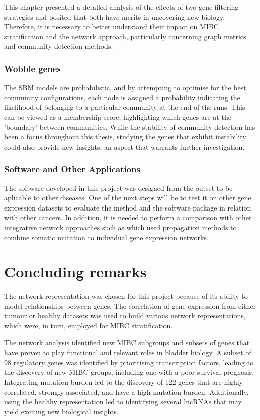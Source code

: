 This chapter presented a detailed analysis of the effects of two gene filtering strategies and posited that both have merits in uncovering new biology. Therefore, it is necessary to better understand their impact on MIBC stratification and the network approach, particularly concerning graph metrics and community detection methods. 

\subsubsection*{Wobble genes}

The SBM models are probabilistic, and by attempting to optimise for the best community configurations, each node is assigned a probability indicating the likelihood of belonging to a particular community at the end of the runs. This can be viewed as a membership score, highlighting which genes are at the 'boundary' between communities. While the stability of community detection has been a focus throughout this thesis, studying the genes that exhibit instability could also provide new insights, an aspect that warrants further investigation.

\subsubsection*{Software and Other Applications}

The software developed in this project was designed from the outset to be aplicable to other diseases. One of the next steps will be to test it on other gene expression datasets to evaluate the method and the software package in relation with other cancers. In addition, it is needed to perform a comparison with other integrative network approaches such as \citet{Hofree2013-ld,He2017-dj} which used propagation methods to combine somatic mutation to individual gene expression networks.


\section{Concluding remarks}

The network representation was chosen for this project because of its ability to model relationships between genes. The correlation of gene expression from either tumour or healthy datasets was used to build various network representations, which were, in turn, employed for MIBC stratification.


The network analysis identified new MIBC subgroups and subsets of genes that have proven to play functional and relevant roles in bladder biology. A subset of 98 regulatory genes was identified by prioritising transcription factors, leading to the discovery of new MIBC groups, including one with a poor survival prognosis. Integrating mutation burden led to the discovery of 122 genes that are highly correlated, strongly associated, and have a high mutation burden. Additionally, using the healthy representation led to identifying several lncRNAs that may yield exciting new biological insights.

